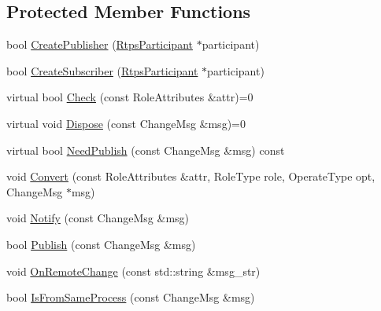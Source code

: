 \subsection*{Protected Member Functions}
\begin{DoxyCompactItemize}
\item 
bool \hyperlink{classapollo_1_1cyber_1_1service__discovery_1_1Manager_a722f92a9db32919ef83b9fbfcaaff85a}{Create\-Publisher} (\hyperlink{classapollo_1_1cyber_1_1service__discovery_1_1Manager_a7576b9ac293ff99af06e30a971df5dce}{Rtps\-Participant} $\ast$participant)
\item 
bool \hyperlink{classapollo_1_1cyber_1_1service__discovery_1_1Manager_a777040a412671e776f1f750933a629f3}{Create\-Subscriber} (\hyperlink{classapollo_1_1cyber_1_1service__discovery_1_1Manager_a7576b9ac293ff99af06e30a971df5dce}{Rtps\-Participant} $\ast$participant)
\item 
virtual bool \hyperlink{classapollo_1_1cyber_1_1service__discovery_1_1Manager_acfa0224581a6722daf4861f34e4c11ef}{Check} (const Role\-Attributes \&attr)=0
\item 
virtual void \hyperlink{classapollo_1_1cyber_1_1service__discovery_1_1Manager_a6e36e4095291597364ce4b37ee1c897b}{Dispose} (const Change\-Msg \&msg)=0
\item 
virtual bool \hyperlink{classapollo_1_1cyber_1_1service__discovery_1_1Manager_ab3221bff519725654e6e232d6ad528e0}{Need\-Publish} (const Change\-Msg \&msg) const 
\item 
void \hyperlink{classapollo_1_1cyber_1_1service__discovery_1_1Manager_a0aee2af4344c78f97ec72b885d98ab5d}{Convert} (const Role\-Attributes \&attr, Role\-Type role, Operate\-Type opt, Change\-Msg $\ast$msg)
\item 
void \hyperlink{classapollo_1_1cyber_1_1service__discovery_1_1Manager_a086e96a029a1f05a0561d57e541c9526}{Notify} (const Change\-Msg \&msg)
\item 
bool \hyperlink{classapollo_1_1cyber_1_1service__discovery_1_1Manager_a2a82d0febb575ddd693184b639016426}{Publish} (const Change\-Msg \&msg)
\item 
void \hyperlink{classapollo_1_1cyber_1_1service__discovery_1_1Manager_a8c4903e0876ace79003d4e2994be43ab}{On\-Remote\-Change} (const std\-::string \&msg\-\_\-str)
\item 
bool \hyperlink{classapollo_1_1cyber_1_1service__discovery_1_1Manager_a26c75e76647b6753e1565c4129c518f7}{Is\-From\-Same\-Process} (const Change\-Msg \&msg)
\end{DoxyCompactItemize}
